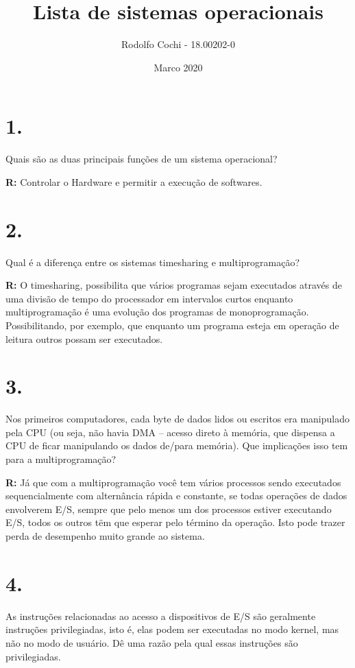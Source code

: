 \documentclass{article}
\title{Lista de sistemas operacionais}
\author{Rodolfo Cochi - 18.00202-0 }
\date{Marco 2020}
\begin{document}
\maketitle
\pagebreak

\section*{1.}
Quais são as duas principais funções de um sistema operacional?

\medskip
\noindent
\textbf{R:} Controlar o Hardware e permitir a execução de softwares.

\section*{2.}
Qual é a diferença entre os sistemas timesharing e multiprogramação?

\medskip
\noindent
\textbf{R:} O timesharing, possibilita que vários programas sejam executados através de uma divisão de tempo do processador em intervalos curtos enquanto multiprogramação é uma evolução dos programas de monoprogramação. Possibilitando, por exemplo, que enquanto um programa esteja em operação de leitura outros possam ser executados.

\section*{3.}
Nos primeiros computadores, cada byte de dados lidos ou escritos era manipulado pela
CPU (ou seja, não havia DMA – acesso direto à memória, que dispensa a CPU de ficar
manipulando os dados de/para memória). Que implicações isso tem para a
multiprogramação?

\medskip
\noindent
\textbf{R:} Já que com a multiprogramação você tem vários processos sendo executados sequencialmente com alternância rápida e constante, se todas operações de dados envolverem E/S, sempre que pelo menos um dos processos estiver executando E/S, todos os outros tëm que esperar pelo término da operação. Isto pode trazer perda de desempenho muito grande ao sistema.

\section*{4.}
As instruções relacionadas ao acesso a dispositivos de E/S são geralmente instruções
privilegiadas, isto é, elas podem ser executadas no modo kernel, mas não no modo de
usuário. Dê uma razão pela qual essas instruções são privilegiadas.
\end{document}
